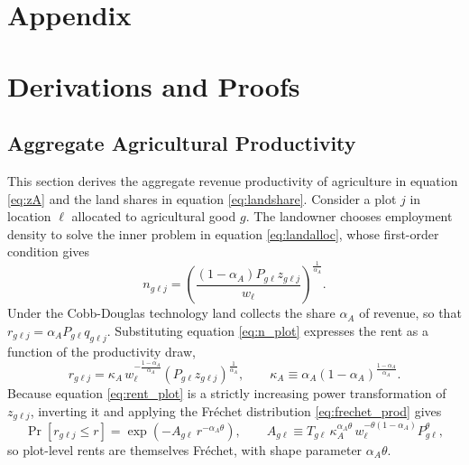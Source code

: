 \documentclass[11pt]{article}
\begin{document}

\clearpage


\newpage
\section*{Appendix}

\appendix
\section{Derivations and Proofs}
\label{app:derivations}

\subsection{Aggregate Agricultural Productivity}
\label{app:zA}

This section derives the aggregate revenue productivity of agriculture in equation
\eqref{eq:zA} and the land shares in equation \eqref{eq:landshare}. Consider a plot $j$ in
location $\ell$ allocated to agricultural good $g$. The landowner chooses employment density
to solve the inner problem in equation \eqref{eq:landalloc}, whose first-order condition gives
\begin{equation}
n_{g\ell j}=\left(\frac{(1-\alpha_A)P_{g\ell}z_{g\ell j}}{w_\ell}\right)^{\frac{1}{\alpha_A}}.
\label{eq:n_plot}
\end{equation}
Under the Cobb-Douglas technology land collects the share $\alpha_A$ of revenue, so that
$r_{g\ell j}=\alpha_A P_{g\ell}q_{g\ell j}$. Substituting equation \eqref{eq:n_plot} expresses
the rent as a function of the productivity draw,
\begin{equation}
r_{g\ell j}=\kappa_A\, w_\ell^{-\frac{1-\alpha_A}{\alpha_A}}
\left(P_{g\ell}z_{g\ell j}\right)^{\frac{1}{\alpha_A}},
\qquad
\kappa_A \equiv \alpha_A(1-\alpha_A)^{\frac{1-\alpha_A}{\alpha_A}}.
\label{eq:rent_plot}
\end{equation}
Because equation \eqref{eq:rent_plot} is a strictly increasing power transformation of
$z_{g\ell j}$, inverting it and applying the Fr\'echet distribution \eqref{eq:frechet_prod}
gives
\begin{equation}
\Pr\!\left[r_{g\ell j}\le r\right]=\exp\!\left(-A_{g\ell}\,r^{-\alpha_A\theta}\right),
\qquad
A_{g\ell}\equiv T_{g\ell}\,\kappa_A^{\alpha_A\theta}\,
w_\ell^{-\theta(1-\alpha_A)}P_{g\ell}^{\theta},
\label{eq:rent_frechet}
\end{equation}
so plot-level rents are themselves Fr\'echet, with shape parameter $\alpha_A\theta$.
\end{document}
